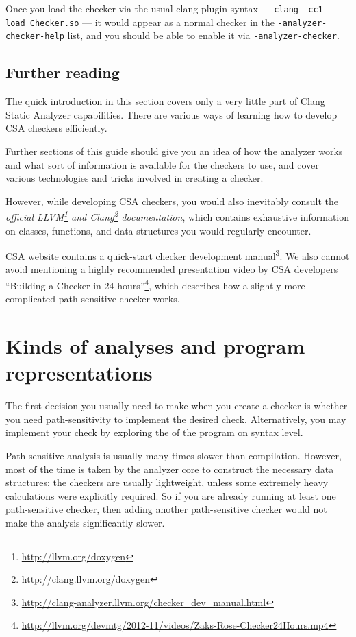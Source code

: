 \documentclass[a4paper,12pt]{article}
\begin{document}
Once you load the checker via the usual clang plugin syntax --- \lstinline|clang -cc1 -load Checker.so| --- it would appear as a normal checker in the \lstinline|-analyzer-checker-help| list, and you should be able to enable it via \lstinline|-analyzer-checker|.


\subsection{Further reading}

The quick introduction in this section covers only a very little part of Clang Static Analyzer capabilities. There are various ways of learning how to develop CSA checkers efficiently.

Further sections of this guide should give you an idea of how the analyzer works and what sort of information is available for the checkers to use, and cover various technologies and tricks involved in creating a checker.

However, while developing CSA checkers, you would also inevitably consult the \emph{official LLVM\footnote{\url{http://llvm.org/doxygen}} and Clang\footnote{\url{http://clang.llvm.org/doxygen}} documentation}, which contains exhaustive information on classes, functions, and data structures you would regularly encounter.

CSA website contains a quick-start checker development manual\footnote{\url{http://clang-analyzer.llvm.org/checker_dev_manual.html}}. We also cannot avoid mentioning a highly recommended presentation video by CSA developers ``Building a Checker in 24 hours''\footnote{\url{http://llvm.org/devmtg/2012-11/videos/Zaks-Rose-Checker24Hours.mp4}}, which describes how a slightly more complicated path-sensitive checker works.

\newpage
\section{Kinds of analyses and program representations}\label{sec:data_structures}

The first decision you usually need to make when you create a checker is whether you need path-sensitivity to implement the desired check. Alternatively, you may implement your check by exploring the of the program on syntax level.

Path-sensitive analysis is usually many times slower than compilation. However, most of the time is taken by the analyzer core to construct the necessary data structures; the checkers are usually lightweight, unless some extremely heavy calculations were explicitly required. So if you are already running at least one path-sensitive checker, then adding another path-sensitive checker would not make the analysis significantly slower.
\end{document}
